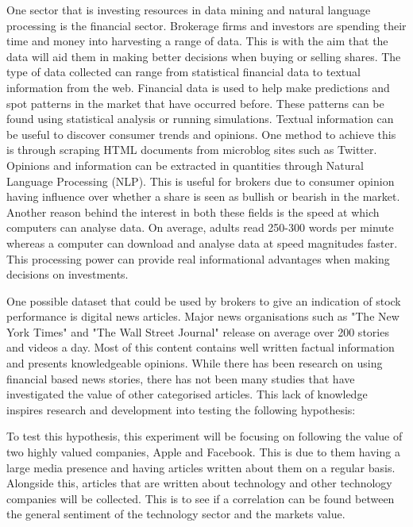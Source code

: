 \documentclass[a4paper,11pt]{report}
\begin{document}
One sector that is investing resources in data mining and natural language processing is the financial sector. Brokerage firms and investors are spending their time and money into harvesting a range of data. This is with the aim that the data will aid them in making better decisions when buying or selling shares.  The type of data collected can range from statistical financial data to textual information from the web. Financial data is used to help make predictions and spot patterns in the market that have occurred before. These patterns can be found using statistical analysis or running simulations. Textual information can be useful to discover consumer trends and opinions. One method to achieve this is through scraping HTML documents from microblog sites such as Twitter. Opinions and information can be extracted in quantities through Natural Language Processing (NLP). This is useful for brokers due to consumer opinion having influence over whether a share is seen as bullish or bearish in the market. Another reason behind the interest in both these fields is the speed at which computers can analyse data. On average, adults read 250-300 words per minute whereas a computer can download and analyse data at speed magnitudes faster. This processing power can provide real informational advantages when making decisions on investments.

One possible dataset that could be used by brokers to give an indication of stock performance is digital news articles. Major news organisations such as "The New York Times" and "The Wall Street Journal" release on average over 200 stories and videos a day. Most of this content contains well written factual information and presents knowledgeable opinions. While there has been research on using financial based news stories, there has not been many studies that have investigated the value of other categorised articles. This lack of knowledge inspires research and development into testing the following hypothesis:\\

\noindent{}

\clearpage

To test this hypothesis, this experiment will be focusing on following the value of two highly valued companies, Apple and Facebook. This is due to them having a large media presence and having articles written about them on a regular basis. Alongside this, articles that are written about technology and other technology companies will be collected. This is to see if a  correlation can be found between the general sentiment of the technology sector and the markets value.
\end{document}

